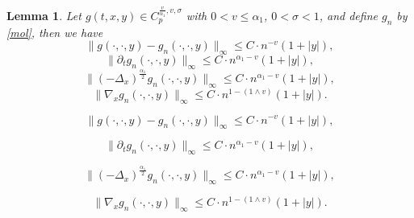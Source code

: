 \documentclass[10pt,a4paper]{amsart}
\newtheorem{lemma}{Lemma}
\begin{document}
\begin{lemma}\label{L51}
	Let $g(t,x,y)\in C_{p}^{\frac{v}{\alpha_{1}}, v,\sigma }$ with $0<v\leq\alpha_{1}$, $0<\sigma<1$, and 
		 define $g_{n}$ by \eqref{mol}, then we have 
	\begin{equation}\label{5.57}
		\|g(\cdot,\cdot,y)-g_{n}(\cdot,\cdot,y)\|_{\infty}\leq C\cdot n^{-v}(1+|y|),
	\end{equation} 
	\begin{equation}\label{5.58-1}
		\|\partial_{t}g_{n}(\cdot,\cdot,y)\|_{\infty}\leq C\cdot n^{\alpha_{1}-v}(1+|y|), 
	\end{equation} 
	\begin{equation}\label{5.58-4}
		\|(-\Delta_{x})^{\frac{\alpha_{1}}{2}}g_{n}(\cdot,\cdot,y)\|_{\infty}\leq C\cdot n^{\alpha_{1}-v}(1+|y|),
	\end{equation} 
	\begin{equation}\label{5.58-3}
		\|\nabla_{x}g_ {n}(\cdot,\cdot,y)\|_{\infty}\leq C\cdot n^{1-(1\wedge v)}(1+|y|).
	\end{equation} 
\end{lemma}

	\begin{equation}
		\|g(\cdot,\cdot,y)-g_{n}(\cdot,\cdot,y)\|_{\infty}\leq C\cdot n^{-v}(1+|y|),
	\end{equation} 

	\begin{equation}
		\|\partial_{t}g_{n}(\cdot,\cdot,y)\|_{\infty}\leq C\cdot n^{\alpha_{1}-v}(1+|y|), 
	\end{equation} 

	\begin{equation}
		\|(-\Delta_{x})^{\frac{\alpha_{1}}{2}}g_{n}(\cdot,\cdot,y)\|_{\infty}\leq C\cdot n^{\alpha_{1}-v}(1+|y|),
	\end{equation} 

	\begin{equation}
		\|\nabla_{x}g_ {n}(\cdot,\cdot,y)\|_{\infty}\leq C\cdot n^{1-(1\wedge v)}(1+|y|).
	\end{equation} 
\end{document}
